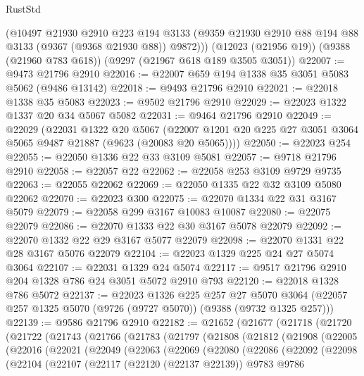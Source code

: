 \begin{lexlean}{RustStd}
\begin{coremodule}
      (@10497
        @21930
        @2910
        @223
        @194
        @3133
        (@9359 @21930 @2910 @88 @194 @88 @3133 (@9367 (@9368 @21930 @88)) @9872)))
    (@12023 (@21956 @19))
    (@9388 (@21960 @783 @618))
    (@9297 (@21967 @618 @189 @3505 @3051))
@22007 := @9473 @21796 @2910
@22016 := @22007 @659 @194 @1338 @35 @3051 @5083 @5062 (@9486 @13142)
@22018 := @9493 @21796 @2910
@22021 := @22018 @1338 @35 @5083
@22023 := @9502 @21796 @2910
@22029 := @22023 @1322 @1337 @20 @34 @5067 @5082
@22031 := @9464 @21796 @2910
@22049 := @22029
    (@22031
      @1322
      @20
      @5067
      (@22007 @1201 @20 @225 @27 @3051 @3064 @5065 @9487 @21887 (@9623 (@20083 @20 @5065))))
@22050 := @22023 @254
@22055 := @22050 @1336 @22 @33 @3109 @5081
@22057 := @9718 @21796 @2910
@22058 := @22057 @22
@22062 := @22058 @253 @3109 @9729 @9735
@22063 := @22055 @22062
@22069 := @22050 @1335 @22 @32 @3109 @5080 @22062
@22070 := @22023 @300
@22075 := @22070 @1334 @22 @31 @3167 @5079
@22079 := @22058 @299 @3167 @10083 @10087
@22080 := @22075 @22079
@22086 := @22070 @1333 @22 @30 @3167 @5078 @22079
@22092 := @22070 @1332 @22 @29 @3167 @5077 @22079
@22098 := @22070 @1331 @22 @28 @3167 @5076 @22079
@22104 := @22023 @1329 @225 @24 @27 @5074 @3064
@22107 := @22031 @1329 @24 @5074
@22117 := @9517 @21796 @2910 @204 @1328 @786 @24 @3051 @5072 @2910 @793
@22120 := @22018 @1328 @786 @5072
@22137 := @22023
    @1326
    @225
    @257
    @27
    @5070
    @3064
    (@22057 @257 @1325 @5070 (@9726 (@9727 @5070)) (@9388 (@9732 @1325 @257)))
@22139 := @9586 @21796 @2910
@22182 := @21652
    (@21677
      (@21718
        (@21720
          (@21722
            (@21743
              (@21766
                (@21783
                  (@21797
                    (@21808
                      (@21812
                        (@21908
                          (@22005
                            (@22016
                              (@22021
                                (@22049
                                  (@22063
                                    (@22069
                                      (@22080
                                        (@22086
                                          (@22092
                                            (@22098
                                              (@22104
                                                (@22107
                                                  (@22117
                                                    (@22120 (@22137 @22139))
                                                    @9783
                                                    @9786

\end{coremodule}
\end{lexlean}
